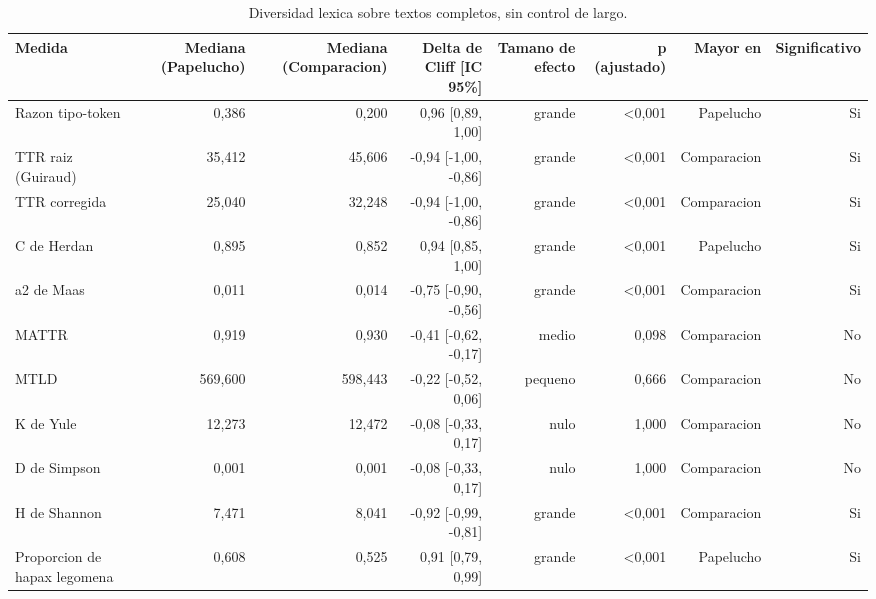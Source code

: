 \begin{table}[htbp]
\centering
\small
\caption{Diversidad lexica sobre textos completos, sin control de largo.}
\label{tab:lexical-wholetext-es}
\begin{tabular}{lrrrrrrr}
\toprule
\textbf{Medida} & \textbf{Mediana (Papelucho)} & \textbf{Mediana (Comparacion)} & \textbf{Delta de Cliff [IC 95\%]} & \textbf{Tamano de efecto} & \textbf{p (ajustado)} & \textbf{Mayor en} & \textbf{Significativo} \\
\midrule
Razon tipo-token & 0,386 & 0,200 & 0,96 [0,89, 1,00] & grande & <0,001 & Papelucho & Si \\
TTR raiz (Guiraud) & 35,412 & 45,606 & -0,94 [-1,00, -0,86] & grande & <0,001 & Comparacion & Si \\
TTR corregida & 25,040 & 32,248 & -0,94 [-1,00, -0,86] & grande & <0,001 & Comparacion & Si \\
C de Herdan & 0,895 & 0,852 & 0,94 [0,85, 1,00] & grande & <0,001 & Papelucho & Si \\
a2 de Maas & 0,011 & 0,014 & -0,75 [-0,90, -0,56] & grande & <0,001 & Comparacion & Si \\
MATTR & 0,919 & 0,930 & -0,41 [-0,62, -0,17] & medio & 0,098 & Comparacion & No \\
MTLD & 569,600 & 598,443 & -0,22 [-0,52, 0,06] & pequeno & 0,666 & Comparacion & No \\
K de Yule & 12,273 & 12,472 & -0,08 [-0,33, 0,17] & nulo & 1,000 & Comparacion & No \\
D de Simpson & 0,001 & 0,001 & -0,08 [-0,33, 0,17] & nulo & 1,000 & Comparacion & No \\
H de Shannon & 7,471 & 8,041 & -0,92 [-0,99, -0,81] & grande & <0,001 & Comparacion & Si \\
Proporcion de hapax legomena & 0,608 & 0,525 & 0,91 [0,79, 0,99] & grande & <0,001 & Papelucho & Si \\
\bottomrule
\end{tabular}
\end{table}

